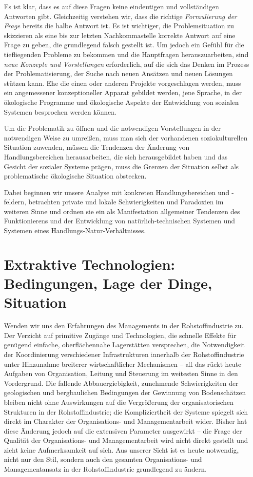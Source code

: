 \documentclass[11pt,a4paper]{article}
\begin{document}
Es ist klar, dass es auf diese Fragen keine eindeutigen und vollständigen
Antworten gibt.  Gleichzeitig verstehen wir, dass die richtige
\emph{Formulierung der Frage} bereits die halbe Antwort ist.  Es ist
wichtiger, die Problemsituation zu skizzieren als eine bis zur letzten
Nachkommastelle korrekte Antwort auf eine Frage zu geben, die grundlegend
falsch gestellt ist. Um jedoch ein Gefühl für die tief\-liegenden Probleme zu
bekommen und die Hauptfragen herauszuarbeiten, sind \emph{neue Konzepte und
  Vorstellungen} erforderlich, auf die sich das Denken im Prozess der
Problematisierung, der Suche nach neuen Ansätzen und neuen Lösungen stützen
kann.  Ehe die einen oder anderen Projekte vorgeschlagen werden, muss ein
angemessener konzeptioneller Apparat gebildet werden, jene Sprache, in der
ökologische Programme und ökologische Aspekte der Entwicklung von sozialen
Systemen besprochen werden können.

Um die Problematik zu öffnen und die notwendigen Vorstellungen in der
notwendigen Weise zu umreißen, muss man sich der vorhandenen soziokulturellen
Situation zuwenden, müssen die Tendenzen der Änderung von Handlungsbereichen
herausarbeiten, die sich herausgebildet haben und das Gesicht der sozialer
Systeme prägen, muss die Grenzen der Situation selbst als problematische
ökologische Situation abstecken.

Dabei beginnen wir unsere Analyse mit konkreten Handlungsbereichen und
-feldern, betrachten private und lokale Schwierigkeiten und Paradoxien im
weiteren Sinne und ordnen sie ein als Manifestation allgemeiner Tendenzen des
Funktionierens und der Entwicklung von natürlich-technischen Systemen und
Systemen eines Handlungs-Natur-Verhältnisses.

\section{Extraktive Technologien: Bedingungen, Lage der Dinge, Situation}

Wenden wir uns den Erfahrungen des Managements in der Rohstoff\-industrie zu.
Der Verzicht auf primitive Zugänge und Technologien, die schnelle Effekte für
genügend einfache, oberflächennahe Lagerstätten versprechen, die Notwendigkeit
der Koordinierung verschiedener Infrastrukturen innerhalb der
Rohstoff\-industrie unter Hinzunahme breiterer wirtschaftlicher Mechanismen --
all das rückt heute Aufgaben von Organisation, Leitung und Steuerung im
weitesten Sinne in den Vordergrund. Die fallende Abbauergiebigkeit, zunehmende
Schwierigkeiten der geologischen und bergbaulichen Bedingungen der Gewinnung
von Bodenschätzen bleiben nicht ohne Auswirkungen auf die Vergrößerung der
organisatorischen Strukturen in der Rohstoff\-industrie; die Kompliziertheit
der Systeme spiegelt sich direkt im Charakter der Organisations- und
Managementarbeit wider. Bisher hat diese Änderung jedoch auf die extensiven
Parameter ausgewirkt -- die Frage der Qualität der Organisations- und
Managementarbeit wird nicht direkt gestellt und zieht keine Aufmerksamkeit auf
sich.  Aus unserer Sicht ist es heute notwendig, nicht nur den Stil, sondern
auch den gesamten Organisations- und Managementansatz in der
Rohstoff\-industrie grundlegend zu ändern.
\end{document}
